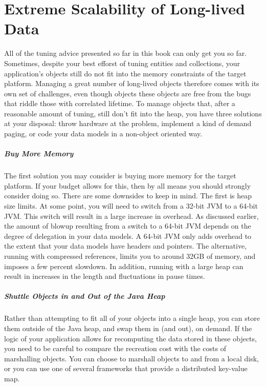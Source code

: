 
\chapter{Extreme Scalability of Long-lived Data}
\label{chapter:large-long-lived}

All of the tuning advice presented so far in this book can only get you so far.
Sometimes, despite your best efforst of tuning entities and collections, your
application's objects still do not fit into the memory constraints of the target
platform. Managing a great number of long-lived objects therefore comes with its
own set of challenges, even though objects these objects are free from the bugs
that riddle those with correlated lifetime. To manage objects that, after a
reasonable amount of tuning, still don't fit into the heap, you have three
solutions at your disposal: throw hardware at the problem, implement a kind of
demand paging, or code your data models in a non-object oriented way.

\paragraph{Buy More Memory} The first solution you may consider is buying more
memory for the target platform. If your budget allows for this, then by all means
you should strongly consider doing so. There are some downsides to keep in mind.
The first is heap size limits. At some point, you will need to switch from a
32-bit JVM to a 64-bit JVM. This switch will result in a large
increase in overhead. As discussed earlier, the amount of blowup resulting from a
switch to a 64-bit JVM depends on the degree of delegation in your data models. A
64-bit JVM only adds overhead to the extent that your data models have headers
and pointers. The alternative, running with compressed
references, limits you to around 32GB of memory, and
imposes a few percent slowdown. In addition, running with a large heap can result
in increases in the length and fluctuations in pause times.

\paragraph{Shuttle Objects in and Out of the Java Heap} Rather than attempting to
fit all of your objects into a single heap, you can store them outside of the
Java heap, and swap them in (and out), on demand. If the logic of your
application allows for recomputing the data stored in these objects, you need to
be careful to compare the recreation cost with the costs of marshalling objects.
You can choose to marshall objects to and from a local disk, or you can use one
of several frameworks that provide a distributed key-value map.

